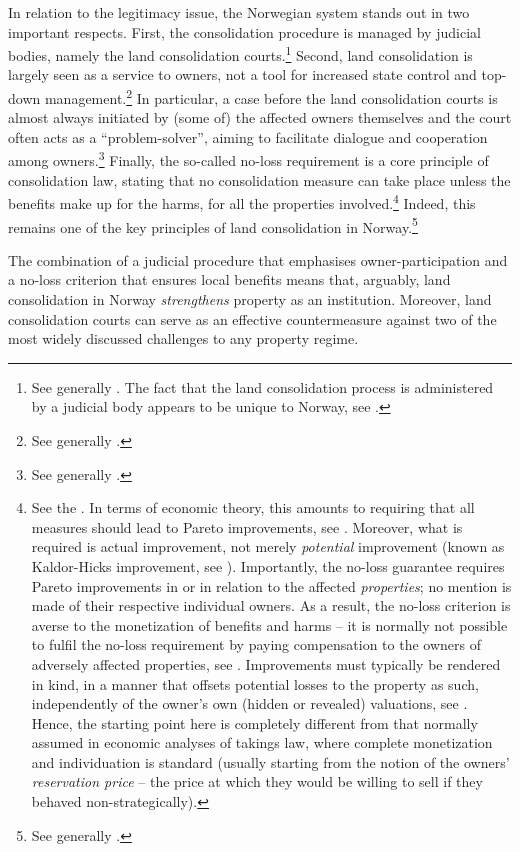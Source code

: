 In relation to the legitimacy issue, the Norwegian system stands out in two important respects. First, the consolidation procedure is managed by judicial bodies, namely the land consolidation courts.\footnote{See generally \cite{langbach09}. The fact that the land consolidation process is administered by a judicial body appears to be unique to Norway, see \cite[45]{sky01}.} Second, land consolidation is largely seen as a service to owners, not a tool for increased state control and top-down management.\footnote{See generally \cite{sky09}.} In particular, a case before the land consolidation courts is almost always initiated by (some of) the affected owners themselves and the court often acts as a ``problem-solver'', aiming to facilitate dialogue and cooperation among owners.\footnote{See generally \cite{rognes98,rognes03,rognes07}.} Finally, the so-called no-loss requirement is a core principle of consolidation law, stating that no consolidation measure can take place unless the benefits make up for the harms, for all the properties involved.\footnote{See the \dni\cite[3 a)]{lca79}. In terms of economic theory, this amounts to requiring that all measures should lead to Pareto improvements, see \cite[59-61]{miceli11}. Moreover, what is required is actual improvement, not merely {\it potential} improvement (known as Kaldor-Hicks improvement, see \cite[61-63]{miceli11}). Importantly, the no-loss guarantee requires Pareto improvements in or in relation to the affected {\it properties}; no mention is made of their respective individual owners. As a result, the no-loss criterion is averse to the monetization of benefits and harms -- it is normally not possible to fulfil the no-loss requirement by paying compensation to the owners of adversely affected properties, see \cite[394]{sky09}. Improvements must typically be rendered in kind, in a manner that offsets potential losses to the property as such, independently of the owner's own (hidden or revealed) valuations, see \cite[371-372]{sky09}. Hence, the starting point here is completely different from that normally assumed in economic analyses of takings law, where complete monetization and individuation is standard (usually starting from the notion of the owners' {\it reservation price} -- the price at which they would be willing to sell if they behaved non-strategically).} Indeed, this remains one of the key principles of land consolidation in Norway.\footnote{See generally \cite{rygg98}.}

The combination of a judicial procedure that emphasises owner-participation and a no-loss criterion that ensures local benefits means that, arguably, land consolidation in Norway {\it strengthens} property as an institution. Moreover, land consolidation courts can serve as an effective countermeasure against two of the most widely discussed challenges to any property regime. 

